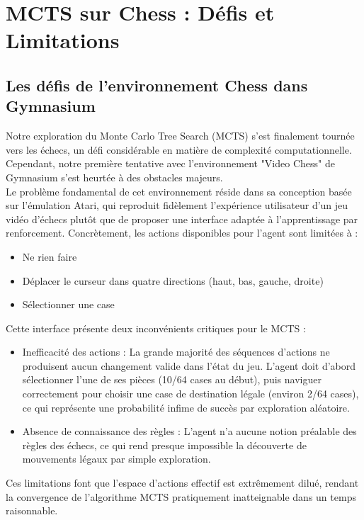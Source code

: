 \documentclass{article}
\begin{document}
\clearpage

\section{MCTS sur Chess : Défis et Limitations}

\subsection{Les défis de l'environnement Chess dans Gymnasium}

\quad Notre exploration du Monte Carlo Tree Search (MCTS) s'est finalement tournée vers les échecs, un défi considérable en matière de complexité computationnelle. Cependant, notre première tentative avec l'environnement "Video Chess" de Gymnasium s'est heurtée à des obstacles majeurs.\\

Le problème fondamental de cet environnement réside dans sa conception basée sur l'émulation Atari, qui reproduit fidèlement l'expérience utilisateur d'un jeu vidéo d'échecs plutôt que de proposer une interface adaptée à l'apprentissage par renforcement. Concrètement, les actions disponibles pour l'agent sont limitées à :
\begin{itemize} 
    \item Ne rien faire
    \item Déplacer le curseur dans quatre directions (haut, bas, gauche, droite)
    \item Sélectionner une case
\end{itemize}

Cette interface présente deux inconvénients critiques pour le MCTS :
\begin{itemize} 
    \item Inefficacité des actions : La grande majorité des séquences d'actions ne produisent aucun changement valide dans l'état du jeu. L'agent doit d'abord sélectionner l'une de ses pièces (10/64 cases au début), puis naviguer correctement pour choisir une case de destination légale (environ 2/64 cases), ce qui représente une probabilité infime de succès par exploration aléatoire.
    \item Absence de connaissance des règles : L'agent n'a aucune notion préalable des règles des échecs, ce qui rend presque impossible la découverte de mouvements légaux par simple exploration.
\end{itemize}

Ces limitations font que l'espace d'actions effectif est extrêmement dilué, rendant la convergence de l'algorithme MCTS pratiquement inatteignable dans un temps raisonnable.
\end{document}
